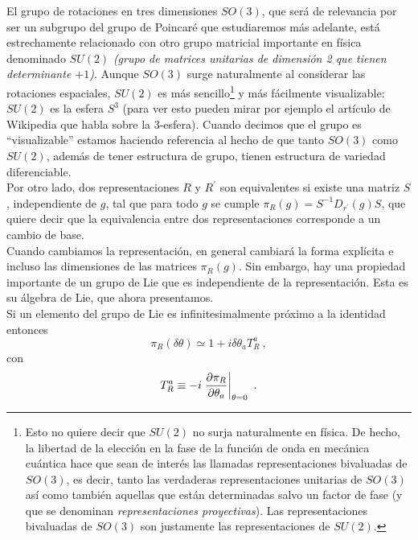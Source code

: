 \vspace{0.2cm}
El grupo de rotaciones en tres dimensiones $S O(3)$, que será de relevancia por ser un subgrupo del grupo de Poincaré que estudiaremos más adelante, está estrechamente relacionado con otro grupo matricial importante en física denominado $S U(2)$ \emph{(grupo de matrices unitarias de dimensión 2 que tienen determinante $+1$)}. Aunque $S O(3)$ surge naturalmente al considerar las rotaciones espaciales, $S U(2)$ es más sencillo\footnote{Esto no quiere decir que $SU(2)$ no surja naturalmente en física. De hecho, la libertad de la elección en la fase de la función de onda en mecánica cuántica hace que sean de interés las llamadas representaciones bivaluadas de $SO(3)$, es decir, tanto las verdaderas representaciones unitarias de $SO(3)$ así como también aquellas que están determinadas salvo un factor de fase (y que se denominan \emph{representaciones proyectivas}). Las representaciones bivaluadas de $SO(3)$ son justamente las representaciones de $SU(2)$.} y más fácilmente visualizable: $S U(2)$ es la esfera $S^{3}$ (para ver esto pueden mirar por ejemplo el artículo de Wikipedia que habla sobre la 3-esfera). Cuando decimos que el grupo es ``visualizable'' estamos haciendo referencia al hecho de que tanto $S O(3)$ como $S U(2)$, además de tener estructura de grupo, tienen estructura de variedad diferenciable.\\

Por otro lado, dos representaciones $R$ y $R^{\prime}$ son equivalentes si existe una matriz $S$, independiente de $g$, tal que para todo $g$ se cumple $\pi_{R}(g) = S^{-1}D_{r^{\prime}}(g)S$, que quiere decir que la equivalencia entre dos representaciones corresponde a un cambio de base.\\

Cuando cambiamos la representación, en general cambiará la forma explícita e incluso las dimensiones de las matrices $\pi_{R}(g)$. Sin embargo, hay una propiedad importante de un grupo de Lie que es independiente de la representación. Esta es su álgebra de Lie, que ahora presentamos.\\

Si un elemento del grupo de Lie es infinitesimalmente próximo a la identidad entonces
\begin{equation}
    \pi_{R}(\delta \theta) \simeq 1 + i \delta \theta_{a}T^{a}_{R} ~,
    \label{apro}
\end{equation}
con
\begin{equation}
    T^{a}_{R} \equiv -i \eval{\pdv{\pi_{R}}{\theta_{a}}}_{\theta=0}~.
    \label{eqA2.4}
\end{equation}

